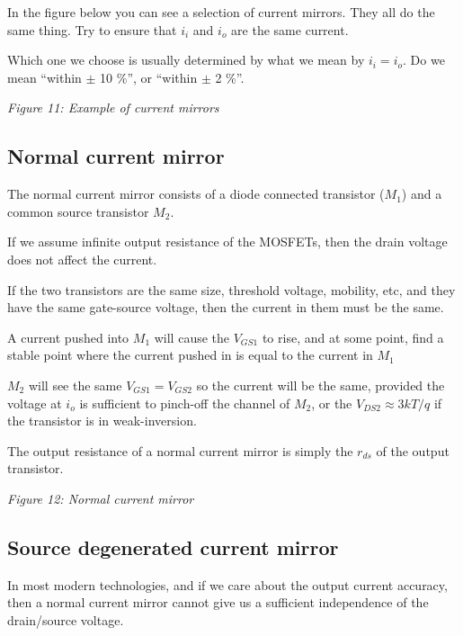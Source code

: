 In the figure below you can see a selection of current mirrors. They all
do the same thing. Try to ensure that \(i_i\) and \(i_o\) are the same
current.

Which one we choose is usually determined by what we mean by
\(i_i = i_o\). Do we mean ``within \(\pm\) 10 \%'', or ``within \(\pm\)
2 \%''.


{
\centering
{}
}

\emph{Figure 11: Example of current mirrors }

\subsection{Normal current mirror}\label{normal-current-mirror}

The normal current mirror consists of a diode connected transistor
(\(M_1\)) and a common source transistor \(M_2\).

If we assume infinite output resistance of the MOSFETs, then the drain
voltage does not affect the current.

If the two transistors are the same size, threshold voltage, mobility,
etc, and they have the same gate-source voltage, then the current in
them must be the same.

A current pushed into \(M_1\) will cause the \(V_{GS1}\) to rise, and at
some point, find a stable point where the current pushed in is equal to
the current in \(M_1\)

\(M_2\) will see the same \(V_{GS1} = V_{GS2}\) so the current will be
the same, provided the voltage at \(i_o\) is sufficient to pinch-off the
channel of \(M_2\), or the \(V_{DS2} \approx 3 kT/q\) if the transistor
is in weak-inversion.

The output resistance of a normal current mirror is simply the
\(r_{ds}\) of the output transistor.


{
\centering
{}
}

\emph{Figure 12: Normal current mirror }

\subsection{Source degenerated current
mirror}\label{source-degenerated-current-mirror}

In most modern technologies, and if we care about the output current
accuracy, then a normal current mirror cannot give us a sufficient
independence of the drain/source voltage.

